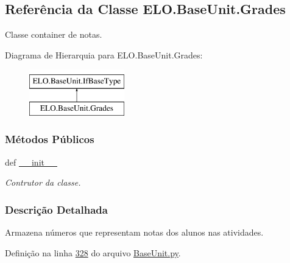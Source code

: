 \hypertarget{classELO_1_1BaseUnit_1_1Grades}{\subsection{Referência da Classe E\-L\-O.\-Base\-Unit.\-Grades}
\label{classELO_1_1BaseUnit_1_1Grades}
}


Classe container de notas.  


Diagrama de Hierarquia para E\-L\-O.\-Base\-Unit.\-Grades\-:\begin{figure}[H]
\begin{center}
\leavevmode
\includegraphics[height=2.000000cm]{dc/d3a/classELO_1_1BaseUnit_1_1Grades}
\end{center}
\end{figure}
\subsubsection*{Métodos Públicos}
\begin{DoxyCompactItemize}
\item 
def \hyperlink{classELO_1_1BaseUnit_1_1Grades_af948e06e9c08a7d99da82eae5f851839}{\-\_\-\-\_\-init\-\_\-\-\_\-}
\begin{DoxyCompactList}\small\item\em Contrutor da classe. \end{DoxyCompactList}\end{DoxyCompactItemize}


\subsubsection{Descrição Detalhada}
Armazena números que representam notas dos alunos nas atividades. 

Definição na linha \hyperlink{BaseUnit_8py_source_l00328}{328} do arquivo \hyperlink{BaseUnit_8py_source}{Base\-Unit.\-py}.



